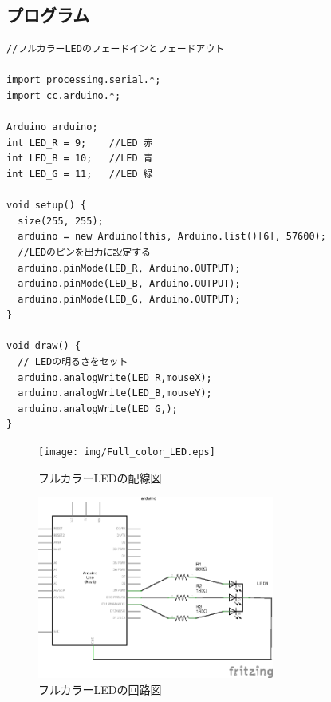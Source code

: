 \documentclass[11pt,a4paper]{jarticle}
\begin{document}
\subsection*{プログラム}
\begin{lstlisting}
//フルカラーLEDのフェードインとフェードアウト

import processing.serial.*;
import cc.arduino.*;
 
Arduino arduino;
int LED_R = 9;    //LED 赤
int LED_B = 10;   //LED 青
int LED_G = 11;   //LED 緑

void setup() {
  size(255, 255);
  arduino = new Arduino(this, Arduino.list()[6], 57600);
  //LEDのピンを出力に設定する
  arduino.pinMode(LED_R, Arduino.OUTPUT);
  arduino.pinMode(LED_B, Arduino.OUTPUT);
  arduino.pinMode(LED_G, Arduino.OUTPUT);
}

void draw() {
  // LEDの明るさをセット
  arduino.analogWrite(LED_R,mouseX);
  arduino.analogWrite(LED_B,mouseY);
  arduino.analogWrite(LED_G,);
}\end{lstlisting}

\begin{figure}[h!]
 \begin{minipage}{0.5\columnwidth}
  \centering
  \texttt{[image: img/Full\_color\_LED.eps]}
  \caption{フルカラーLEDの配線図}
  \label{circuit}
 \end{minipage}
 \begin{minipage}{0.5\columnwidth}
  \centering
  \includegraphics[height=60mm]{img/Full_color_LED_circuit.eps}
  \caption{フルカラーLEDの回路図}
 \end{minipage}
\end{figure}
\end{document}
